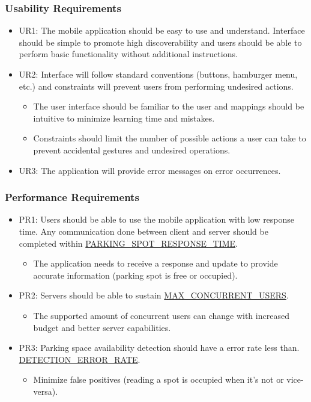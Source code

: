 \documentclass[]{article}
\begin{document}
\subsubsection{Usability Requirements}
\begin{itemize}
	\item UR1: The mobile application should be easy to use and understand. Interface should be simple to promote high discoverability and users should be able to perform basic functionality without additional instructions.
	\item UR2: Interface will follow standard conventions (buttons, hamburger menu, etc.) and constraints will prevent users from performing undesired actions.
	\begin{itemize}
		\item The user interface should be familiar to the user and mappings should be intuitive to minimize learning time and mistakes.
		\item Constraints should limit the number of possible actions a user can take to prevent accidental gestures and undesired operations.
	\end{itemize}
	\item UR3: The application will provide error messages on error occurrences.
\end{itemize}

\subsubsection{Performance Requirements}
\begin{itemize}
	\item PR1: Users should be able to use the mobile application with low response time. Any communication done between client and server should be completed within \hyperlink{RESPONSETIME}{PARKING\_SPOT\_RESPONSE\_TIME}.
	\begin{itemize}
		\item The application needs to receive a response and update to provide accurate information (parking spot is free or occupied).
	\end{itemize}

	\item PR2: Servers should be able to sustain \hyperlink{CONCUSERS}{MAX\_CONCURRENT\_USERS}.
	\begin{itemize}
		\item The supported amount of concurrent users can change with increased budget and better server capabilities.
	\end{itemize}

	\item PR3: Parking space availability detection should have a error rate less than. \hyperlink{DETERR}{DETECTION\_ERROR\_RATE}.
	\begin{itemize}
		\item Minimize false positives (reading a spot is occupied when it’s not or vice-versa).
	\end{itemize}
\end{itemize}
\end{document}
